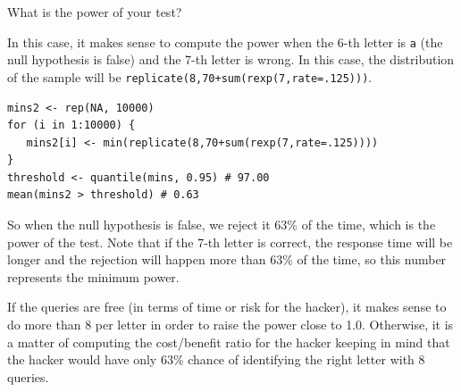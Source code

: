 \documentclass[12pt]{article}
\begin{document}
\begin{Exercise}[label={exo10}]
  What is the power of your test?
\end{Exercise}
\begin{Answer}[ref={exo10}]
  In this case, it makes sense to compute the power when the 6-th
  letter is \texttt{a} (the null hypothesis is false) and the
  7-th letter is wrong. In this case, the distribution of
  the sample will be \texttt{replicate(8,70+sum(rexp(7,rate=.125)))}.

\begin{verbatim}
mins2 <- rep(NA, 10000)
for (i in 1:10000) {
   mins2[i] <- min(replicate(8,70+sum(rexp(7,rate=.125))))
}
threshold <- quantile(mins, 0.95) # 97.00
mean(mins2 > threshold) # 0.63
\end{verbatim}

  So when the null hypothesis is false, we reject it 63\% of
  the time, which is the power of the test. Note that if the 7-th
  letter is correct, the response time will be longer and the
  rejection will happen more than 63\% of the time, so this
  number represents the minimum power.
  
  If the queries are free
  (in terms of time or risk for the hacker), it makes sense
  to do more than 8 per letter in order to raise the power close
  to 1.0. Otherwise, it is a matter of computing the cost/benefit
  ratio for the hacker keeping in mind that the hacker would have
  only 63\% chance of identifying the right letter with 8 queries.
  


\end{Answer}

\cleardoublepage
\shipoutAnswer
\end{document}
